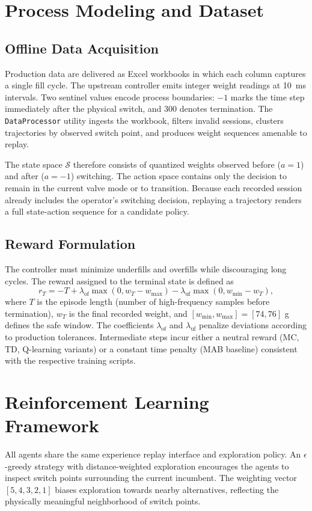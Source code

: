 \documentclass[journal]{IEEEtranTIE}
\begin{document}
\section{Process Modeling and Dataset}
\subsection{Offline Data Acquisition}
Production data are delivered as Excel workbooks in which each column captures a single fill cycle. The upstream controller emits integer weight readings at \SI{10}{ms} intervals. Two sentinel values encode process boundaries: $-1$ marks the time step immediately after the physical switch, and $300$ denotes termination. The \texttt{DataProcessor} utility ingests the workbook, filters invalid sessions, clusters trajectories by observed switch point, and produces weight sequences amenable to replay.

The state space $\mathcal{S}$ therefore consists of quantized weights observed before ($a=1$) and after ($a=-1$) switching. The action space contains only the decision to remain in the current valve mode or to transition. Because each recorded session already includes the operator's switching decision, replaying a trajectory renders a full state-action sequence for a candidate policy.

\subsection{Reward Formulation}
The controller must minimize underfills and overfills while discouraging long cycles. The reward assigned to the terminal state is defined as
\begin{equation}
  r_T = -T + \lambda_{\text{of}} \max(0, w_T - w_{\max}) - \lambda_{\text{uf}} \max(0, w_{\min} - w_T),
  \label{eq:reward}
\end{equation}
where $T$ is the episode length (number of high-frequency samples before termination), $w_T$ is the final recorded weight, and $[w_{\min}, w_{\max}] = [74, 76]$ \si{g} defines the safe window. The coefficients $\lambda_{\text{of}}$ and $\lambda_{\text{uf}}$ penalize deviations according to production tolerances. Intermediate steps incur either a neutral reward (MC, TD, Q-learning variants) or a constant time penalty (MAB baseline) consistent with the respective training scripts.

\section{Reinforcement Learning Framework}
All agents share the same experience replay interface and exploration policy. An $\epsilon$-greedy strategy with distance-weighted exploration encourages the agents to inspect switch points surrounding the current incumbent. The weighting vector $[5, 4, 3, 2, 1]$ biases exploration towards nearby alternatives, reflecting the physically meaningful neighborhood of switch points.
\end{document}
